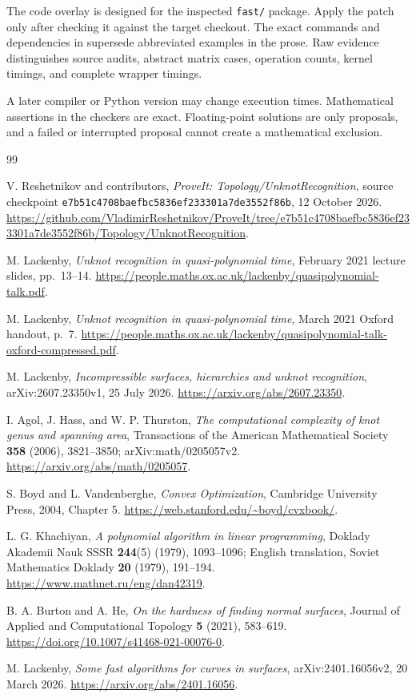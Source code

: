 \documentclass[11pt]{article}
\theoremstyle{definition}
\theoremstyle{remark}
\newcommand{\code}[1]{\texttt{#1}}
\begin{document}
The code overlay is designed for the inspected \code{fast/} package.
Apply the patch only after checking it against the target checkout.
The exact commands and dependencies in  supersede
abbreviated examples in the prose. Raw evidence distinguishes
source audits, abstract matrix cases, operation counts, kernel timings,
and complete wrapper timings.

A later compiler or Python version may change execution times.
Mathematical assertions in the checkers are exact. Floating-point
solutions are only proposals, and a failed or interrupted proposal
cannot create a mathematical exclusion.

\begin{thebibliography}{99}
\raggedright
{}
V. Reshetnikov and contributors,
\emph{ProveIt: Topology/UnknotRecognition},
source checkpoint \code{e7b51c4708baefbc5836ef233301a7de3552f86b},
12 October 2026.
\url{https://github.com/VladimirReshetnikov/ProveIt/tree/e7b51c4708baefbc5836ef233301a7de3552f86b/Topology/UnknotRecognition}.

M. Lackenby,
\emph{Unknot recognition in quasi-polynomial time},
February 2021 lecture slides, pp.~13--14.
\url{https://people.maths.ox.ac.uk/lackenby/quasipolynomial-talk.pdf}.

M. Lackenby,
\emph{Unknot recognition in quasi-polynomial time},
March 2021 Oxford handout, p.~7.
\url{https://people.maths.ox.ac.uk/lackenby/quasipolynomial-talk-oxford-compressed.pdf}.

M. Lackenby,
\emph{Incompressible surfaces, hierarchies and unknot recognition},
arXiv:2607.23350v1, 25 July 2026.
\url{https://arxiv.org/abs/2607.23350}.

I. Agol, J. Hass, and W. P. Thurston,
\emph{The computational complexity of knot genus and spanning area},
Transactions of the American Mathematical Society \textbf{358} (2006),
3821--3850; arXiv:math/0205057v2.
\url{https://arxiv.org/abs/math/0205057}.

S. Boyd and L. Vandenberghe,
\emph{Convex Optimization},
Cambridge University Press, 2004, Chapter 5.
\url{https://web.stanford.edu/~boyd/cvxbook/}.

L. G. Khachiyan,
\emph{A polynomial algorithm in linear programming},
Doklady Akademii Nauk SSSR \textbf{244}(5) (1979), 1093--1096;
English translation, Soviet Mathematics Doklady \textbf{20} (1979), 191--194.
\url{https://www.mathnet.ru/eng/dan42319}.

B. A. Burton and A. He,
\emph{On the hardness of finding normal surfaces},
Journal of Applied and Computational Topology \textbf{5} (2021),
583--619.
\url{https://doi.org/10.1007/s41468-021-00076-0}.

M. Lackenby,
\emph{Some fast algorithms for curves in surfaces},
arXiv:2401.16056v2, 20 March 2026.
\url{https://arxiv.org/abs/2401.16056}.
\end{thebibliography}
\end{document}
